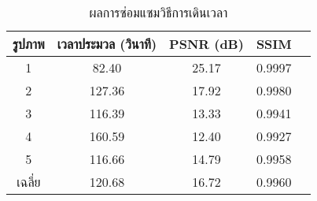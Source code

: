 \begin{table}[H]
	\centering
	\begin{tabular}[ht]{|c|c|c|c|c|}
		\hline
		รูปภาพ &เวลาประมวล  (วินาที) & PSNR (dB) & SSIM \\
		\hline
		1 & 82.40 & 25.17 & 0.9997 \\ 
		2 & 127.36 & 17.92 & 0.9980 \\
		3 &  116.39 & 13.33 & 0.9941 \\
		4 & 160.59  &12.40  & 0.9927 \\
		5 & 116.66  & 14.79  & 0.9958 \\
		\hline
		เฉลี่ย & 120.68  & 16.72  & 0.9960 \\
		\hline
	\end{tabular}
	\caption{ผลการซ่อมแซมวิธีการเดินเวลา}
	\label{table:result-timemarching}
\end{table}